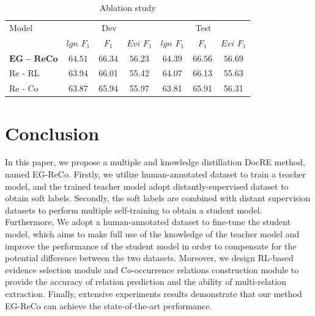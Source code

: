 \documentclass[preprint,12pt]{elsarticle}
\begin{document}
\begin{table}[htbp]
\centering
\caption{Ablation study}\label{tab6}
\begin{tabular*}{\textwidth}{@{\extracolsep\fill}lcccccc}
\hline
Model & \multicolumn{3}{c}{Dev} & \multicolumn{3}{c}{Test} \\
& $lgn$ $F_1$ & $F_1$ & $Evi$ $F_1$ & $lgn$ $F_1$ & $F_1$ & $Evi$ $F_1$ \\
\hline
$\mathbf{EG-ReCo}$  & $\mathbf{64.51}$ & $\mathbf{66.34 }$ & $\mathbf{56.23}$ & $\mathbf{64.39 }$ & $\mathbf{66.56}$ & $\mathbf{56.69}$  \\
Re - RL & 63.94 & 66.01 & 55.42 & 64.07 & 66.13 & 55.63 \\
Re - Co & 63.87 & 65.94 & 55.97 & 63.81 & 65.91 & 56.31 \\
\hline
\end{tabular*}
\end{table}


\section{Conclusion}\label{sec6}

In this paper, we propose a multiple and knowledge distillation DocRE method, named EG-ReCo. Firstly, we utilize human-annotated dataset to train a teacher model, and the trained teacher model adopt distantly-supervised dataset to obtain soft labels. Secondly, the soft labels are combined with distant supervision datasets to perform multiple self-training to obtain a student model. Furthermore, We adopt a human-annotated dataset to fine-tune the student model, which aims to make full use of the knowledge of the teacher model and improve the performance of the student model in order to compensate for the potential difference between the two datasets. Moreover, we design RL-based evidence selection module and Co-occurrence relations construction module to provide the accuracy of relation prediction and the ability of multi-relation extraction. Finally, extensive experiments results demonstrate that our method EG-ReCo can achieve the state-of-the-art performance.
\end{document}
